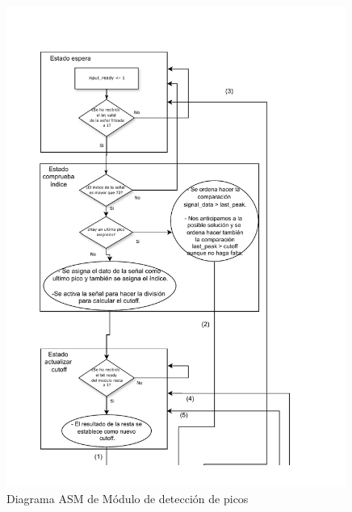 \begin{figure}[h!]
    \centering
    \includegraphics[width=0.99\textwidth]{./Images/img_implementacion_hw/Diagramaasmpicos1.pdf}
    \caption{Diagrama ASM de Módulo de detección de picos}
    \label{fig:Diagramaasmpicos1}
\end{figure} 

